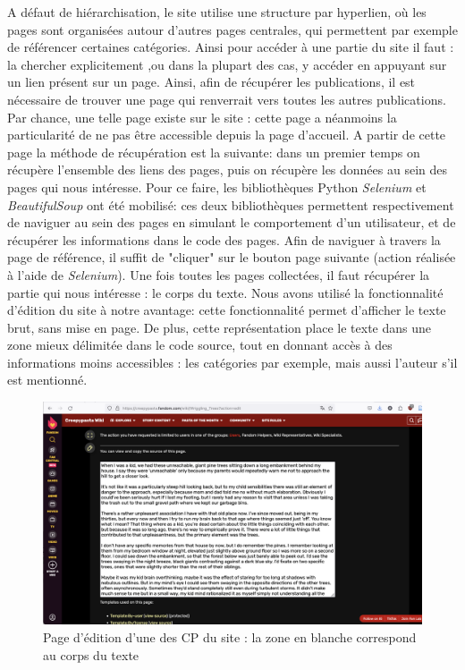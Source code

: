 \documentclass[12pt,a4paper,oneside,titlepage]{book} %
\begin{document}
	A défaut de hiérarchisation, le site utilise une structure par hyperlien, où les pages sont organisées autour d'autres pages centrales, qui permettent par exemple de référencer certaines catégories. Ainsi pour accéder à une partie du site il faut : la chercher explicitement ,ou dans la plupart des cas, y accéder en appuyant sur un lien présent sur un page. 
	Ainsi, afin de récupérer les publications, il est nécessaire de trouver une page qui renverrait vers toutes les autres publications. Par chance, une telle page existe sur le site : cette page a néanmoins la particularité de ne pas être accessible depuis la page d'accueil.
	A partir de cette page la méthode de récupération est la suivante: dans un premier temps on récupère l'ensemble des liens des pages, puis on récupère les données au sein des pages qui nous intéresse. 
	Pour ce faire, les bibliothèques Python \emph{Selenium} et \emph{BeautifulSoup} ont été mobilisé: ces deux bibliothèques permettent respectivement de naviguer au sein des pages en simulant le comportement d'un utilisateur, et de récupérer les informations dans le code des pages. 
	Afin de naviguer à travers la page de référence, il suffit de "cliquer" sur le bouton page suivante (action réalisée à l'aide de \emph{Selenium}). Une fois toutes les pages collectées, il faut récupérer la partie qui nous intéresse : le corps du texte. 
	Nous avons utilisé la fonctionnalité d'édition du site à notre avantage: cette fonctionnalité permet d'afficher le texte brut, sans mise en page. De plus, cette représentation place le texte dans une zone mieux délimitée dans le code source, tout en donnant accès à des informations moins accessibles : les catégories par exemple, mais aussi l'auteur s'il est mentionné. 
	\begin{figure} [htbp]
		\centering
		\includegraphics[scale=0.2]{illustration/site_edit.png}
		\caption{Page d'édition d'une des CP du site : la zone en blanche correspond au corps du texte}
	\end{figure}
	
\end{document}
